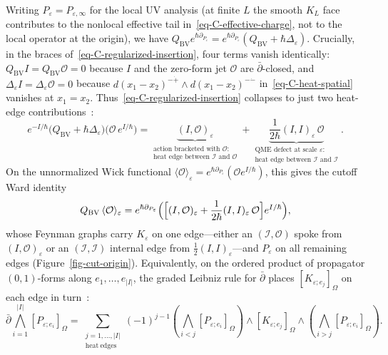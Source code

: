 \documentclass[11pt]{article}
\numberwithin{equation}{section}
\numberwithin{figure}{section}
\numberwithin{table}{section}
\begin{document}
Writing $P_\varepsilon=P_{\varepsilon,\infty}$ for the local UV analysis (at finite $L$ the smooth $K_L$ face contributes to the nonlocal effective tail in~\eqref{eq-C-effective-charge}, not to the local operator at the origin), we have $Q_{\mathrm{BV}}e^{\hbar\partial_{P_\varepsilon}}=e^{\hbar\partial_{P_\varepsilon}}(Q_{\mathrm{BV}}+\hbar\Delta_\varepsilon)$. Crucially, in the braces of~\eqref{eq-C-regularized-insertion}, four terms vanish identically: $Q_{\mathrm{BV}}I=Q_{\mathrm{BV}}\mathcal O=0$ because $I$ and the zero-form jet $\mathcal O$ are $\bar\partial$-closed, and $\Delta_\varepsilon I=\Delta_\varepsilon\mathcal O=0$ because $d(x_1-x_2)^{-\dot+}\wedge d(x_1-x_2)^{-\dot-}$ in~\eqref{eq-C-heat-spatial} vanishes at $x_1=x_2$. Thus~\eqref{eq-C-regularized-insertion} collapses to just two heat-edge contributions~\cite{Costello,semichiral,higher,BK}:
\begin{equation}\label{eq-C-two-cuts}
e^{-I/\hbar}\bigl(Q_{\mathrm{BV}}+\hbar\Delta_\varepsilon\bigr)\bigl(\mathcal O\,e^{I/\hbar}\bigr)
=\underbrace{(I,\mathcal O)_\varepsilon}_{\substack{\text{action bracketed with }\mathcal O:\\ \text{heat edge between }\mathcal I\text{ and }\mathcal O}}
+\underbrace{\frac1{2\hbar}(I,I)_\varepsilon\,\mathcal O}_{\substack{\text{QME defect at scale }\varepsilon:\\ \text{heat edge between }\mathcal I\text{ and }\mathcal I}}.
\end{equation}
On the unnormalized Wick functional $\langle\mathcal O\rangle_\varepsilon=e^{\hbar\partial_{P_\varepsilon}}(\mathcal O e^{I/\hbar})$, this gives the cutoff Ward identity
\begin{equation}\label{eq-C-Ward}
Q_{\mathrm{BV}}\,\langle\mathcal O\rangle_\varepsilon
=e^{\hbar\partial_{P_\varepsilon}}
\Bigl(\Bigl[(I,\mathcal O)_\varepsilon+\frac1{2\hbar}(I,I)_\varepsilon\,\mathcal O\Bigr]e^{I/\hbar}\Bigr),
\end{equation}
whose Feynman graphs carry $K_\varepsilon$ on one edge---either an $(\mathcal I,\mathcal O)$ spoke from $(I,\mathcal O)_\varepsilon$ or an $(\mathcal I,\mathcal I)$ internal edge from $\frac12(I,I)_\varepsilon$---and $P_\varepsilon$ on all remaining edges (Figure~\ref{fig-cut-origin}). Equivalently, on the ordered product of propagator $(0,1)$-forms along $e_1,\ldots,e_{|I|}$, the graded Leibniz rule for $\bar\partial$ places $[K_{\varepsilon;e_j}]_\Omega$ on each edge in turn~\cite[\S2.3]{BK}:
\begin{equation}\label{eq-C-heat-edge-cut}
\bar\partial\bigwedge_{i=1}^{|I|}[P_{\varepsilon;e_i}]_\Omega
=\sum_{\substack{j=1,\ldots,|I|\\\mathrm{heat\ edges}}}(-1)^{j-1}
\left(\bigwedge_{i<j}[P_{\varepsilon;e_i}]_\Omega\right)
\wedge[K_{\varepsilon;e_j}]_\Omega
\wedge\left(\bigwedge_{i>j}[P_{\varepsilon;e_i}]_\Omega\right).
\end{equation}
\end{document}
